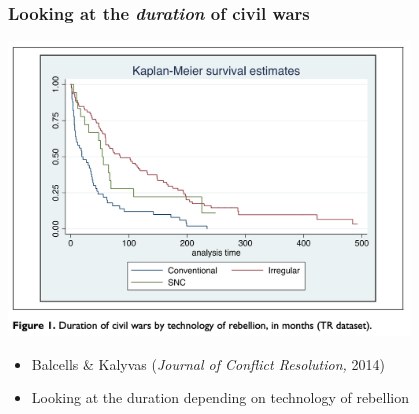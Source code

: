 \documentclass[aspectratio=43]{beamer}
\begin{document}
\begin{frame}
\frametitle{Looking at the \textit{duration} of civil wars}
\centering

\includegraphics[width = 0.8\textwidth]{img/balcells_kalyvas_duration}


\begin{itemize}
  \item Balcells \& Kalyvas (\textit{Journal of Conflict Resolution,} 2014)
  \item Looking at the duration depending on technology of rebellion
\end{itemize}


\end{frame}
\end{document}
